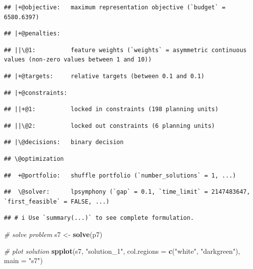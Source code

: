 \documentclass[12pt,]{book}
\newenvironment{Shaded}{\begin{snugshade}}{\end{snugshade}}
\newcommand{\CommentTok}[1]{\textcolor[rgb]{0.56,0.35,0.01}{\textit{#1}}}
\newcommand{\DataTypeTok}[1]{\textcolor[rgb]{0.13,0.29,0.53}{#1}}
\newcommand{\KeywordTok}[1]{\textcolor[rgb]{0.13,0.29,0.53}{\textbf{#1}}}
\newcommand{\NormalTok}[1]{#1}
\newcommand{\StringTok}[1]{\textcolor[rgb]{0.31,0.60,0.02}{#1}}
\begin{document}
\begin{verbatim}
## |+@objective:   maximum representation objective (`budget` = 6580.6397)
\end{verbatim}

\begin{verbatim}
## |+@penalties:
\end{verbatim}

\begin{verbatim}
## ||\@1:          feature weights (`weights` = asymmetric continuous values (non-zero values between 1 and 10))
\end{verbatim}

\begin{verbatim}
## |+@targets:     relative targets (between 0.1 and 0.1)
\end{verbatim}

\begin{verbatim}
## |+@constraints:
\end{verbatim}

\begin{verbatim}
## ||+@1:          locked in constraints (198 planning units)
\end{verbatim}

\begin{verbatim}
## ||\@2:          locked out constraints (6 planning units)
\end{verbatim}

\begin{verbatim}
## |\@decisions:   binary decision
\end{verbatim}

\begin{verbatim}
## \@optimization
\end{verbatim}

\begin{verbatim}
##  +@portfolio:   shuffle portfolio (`number_solutions` = 1, ...)
\end{verbatim}

\begin{verbatim}
##  \@solver:      lpsymphony (`gap` = 0.1, `time_limit` = 2147483647, `first_feasible` = FALSE, ...)
\end{verbatim}

\begin{verbatim}
## # i Use `summary(...)` to see complete formulation.
\end{verbatim}

\begin{Shaded}
\begin{Highlighting}[]
\CommentTok{# solve problem}
\NormalTok{s7 <-}\StringTok{ }\KeywordTok{solve}\NormalTok{(p7)}

\CommentTok{# plot solution}
\KeywordTok{spplot}\NormalTok{(s7, }\StringTok{"solution_1"}\NormalTok{, }\DataTypeTok{col.regions =} \KeywordTok{c}\NormalTok{(}\StringTok{"white"}\NormalTok{, }\StringTok{"darkgreen"}\NormalTok{), }\DataTypeTok{main =} \StringTok{"s7"}\NormalTok{)}
\end{Highlighting}
\end{Shaded}
\end{document}
